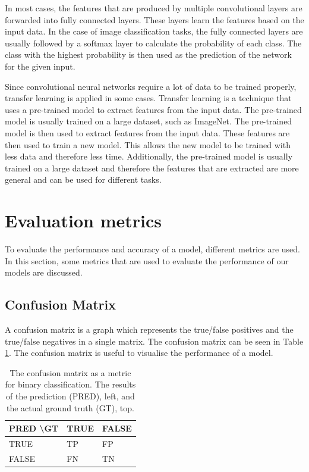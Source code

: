In most cases, the features that are produced by multiple convolutional layers are forwarded into fully connected layers. These layers learn the features based on the input data. In the case of image classification tasks, the fully connected layers are usually followed by a softmax layer to calculate the probability of each class. The class with the highest probability is then used as the prediction of the network for the given input.

Since convolutional neural networks require a lot of data to be trained properly, transfer learning is applied in some cases. Transfer learning is a technique that uses a pre-trained model to extract features from the input data. The pre-trained model is usually trained on a large dataset, such as ImageNet\cite{ImageNet}. The pre-trained model is then used to extract features from the input data. These features are then used to train a new model. This allows the new model to be trained with less data and therefore less time. Additionally, the pre-trained model is usually trained on a large dataset and therefore the features that are extracted are more general and can be used for different tasks. 

\section{Evaluation metrics}

To evaluate the performance and accuracy of a model, different metrics are used. In this section, some metrics that are used to evaluate the performance of our models are discussed.

\subsection{Confusion Matrix}

A confusion matrix is a graph which represents the true/false positives and the true/false negatives in a single matrix. The confusion matrix can be seen in Table \ref{tab:confusion_matrix}. The confusion matrix is useful to visualise the performance of a model.

\begin{table}[ht]
    \caption[The Confusion Matrix]{The confusion matrix as a metric for binary classification. The results of the prediction (PRED), left, and the actual ground truth (GT), top.}
    \label{tab:confusion_matrix}
    \centering
    \begin{tabular}{l|ll}
    PRED \textbackslash GT & TRUE & FALSE \\ \hline
    TRUE                   & TP   & FP    \\
    FALSE                  & FN   & TN   
    \end{tabular}
\end{table}

